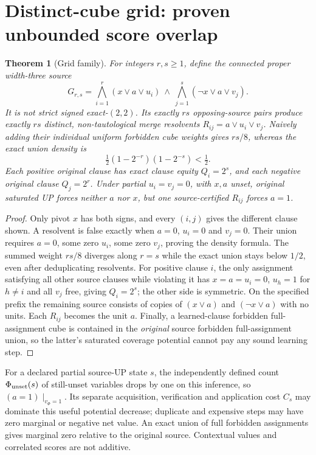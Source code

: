 \documentclass[11pt]{article}
\newtheorem{theorem}{Theorem}
\begin{document}
\section{Distinct-cube grid: proven unbounded score overlap}
\begin{theorem}[Grid family]\label{th:grid}
For integers $r,s\ge1$, define the connected proper width-three source
\[
G_{r,s}=\bigwedge_{i=1}^r(x\lor a\lor u_i)\ \land\
\bigwedge_{j=1}^s(\neg x\lor a\lor v_j).
\]
It is not strict signed exact-$(2,2)$. Its exactly $rs$ opposing-source pairs produce exactly $rs$ \emph{distinct}, non-tautological merge resolvents $R_{ij}=a\lor u_i\lor v_j$. Naively adding their individual uniform forbidden cube weights gives $rs/8$, whereas the exact union density is
\[
\tfrac12(1-2^{-r})(1-2^{-s})<\tfrac12.
\]
Each positive original clause has exact clause equity $Q_i=2^s$, and each negative original clause $Q_j=2^r$. Under partial $u_i=v_j=0$, with $x,a$ unset, original saturated UP forces neither $a$ nor $x$, but one source-certified $R_{ij}$ forces $a=1$.
\end{theorem}
\begin{proof}
Only pivot $x$ has both signs, and every $(i,j)$ gives the different clause shown. A resolvent is false exactly when $a=0$, $u_i=0$ and $v_j=0$. Their union requires $a=0$, some zero $u_i$, some zero $v_j$, proving the density formula. The summed weight $rs/8$ diverges along $r=s$ while the exact union stays below $1/2$, even after deduplicating resolvents. For positive clause $i$, the only assignment satisfying all other source clauses while violating it has $x=a=u_i=0$, $u_h=1$ for $h\ne i$ and all $v_j$ free, giving $Q_i=2^s$; the other side is symmetric. On the specified prefix the remaining source consists of copies of $(x\lor a)$ and $(\neg x\lor a)$ with no units. Each $R_{ij}$ becomes the unit $a$. Finally, a learned-clause forbidden full-assignment cube is contained in the \emph{original} source forbidden full-assignment union, so the latter's saturated coverage potential cannot pay any sound learning step.
\end{proof}
For a declared partial source-UP state $s$, the independently defined count $\Phi_{\rm unset}(s)$ of still-unset variables drops by one on this inference, so $(a=1)\mid_{v_\Phi=1}$. Its separate acquisition, verification and application cost $C_s$ may dominate this useful potential decrease; duplicate and expensive steps may have zero marginal or negative net value. An exact union of full forbidden assignments gives marginal zero relative to the original source. Contextual values and correlated scores are not additive.
\end{document}
